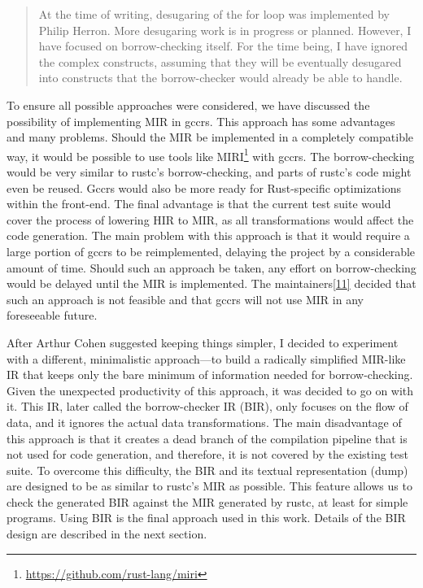 \documentclass[
  11pt,
  twoside,symmetric]{report}
\DeclareRobustCommand{\href}[2]{#2\footnote{\url{#1}}}
\begin{document}
\begin{quote}
At the time of writing, desugaring of the for loop was implemented by
Philip Herron. More desugaring work is in progress or planned. However,
I have focused on borrow-checking itself. For the time being, I have
ignored the complex constructs, assuming that they will be eventually
desugared into constructs that the borrow-checker would already be able
to handle.
\end{quote}

To ensure all possible approaches were considered, we have discussed the
possibility of implementing MIR in gccrs. This approach has some
advantages and many problems. Should the MIR be implemented in a
completely compatible way, it would be possible to use tools like
\href{https://github.com/rust-lang/miri}{MIRI} with gccrs. The
borrow-checking would be very similar to rustc's borrow-checking, and
parts of rustc's code might even be reused. Gccrs would also be more
ready for Rust-specific optimizations within the front-end. The final
advantage is that the current test suite would cover the process of
lowering HIR to MIR, as all transformations would affect the code
generation. The main problem with this approach is that it would require
a large portion of gccrs to be reimplemented, delaying the project by a
considerable amount of time. Should such an approach be taken, any
effort on borrow-checking would be delayed until the MIR is implemented.
The maintainers\protect\hyperlink{ref-zulip}{{[}11{]}} decided that such
an approach is not feasible and that gccrs will not use MIR in any
foreseeable future.

After Arthur Cohen suggested keeping things simpler, I decided to
experiment with a different, minimalistic approach---to build a
radically simplified MIR-like IR that keeps only the bare minimum of
information needed for borrow-checking. Given the unexpected
productivity of this approach, it was decided to go on with it. This IR,
later called the borrow-checker IR (BIR), only focuses on the flow of
data, and it ignores the actual data transformations. The main
disadvantage of this approach is that it creates a dead branch of the
compilation pipeline that is not used for code generation, and
therefore, it is not covered by the existing test suite. To overcome
this difficulty, the BIR and its textual representation (dump) are
designed to be as similar to rustc's MIR as possible. This feature
allows us to check the generated BIR against the MIR generated by rustc,
at least for simple programs. Using BIR is the final approach used in
this work. Details of the BIR design are described in the next section.
\end{document}
